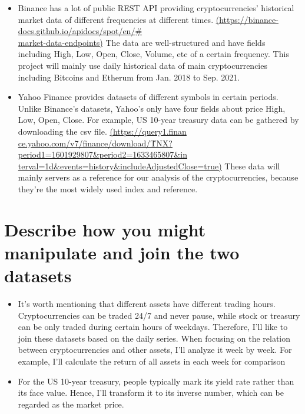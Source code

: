 \documentclass[a4paper]{article}
\begin{document}
\begin{itemize}
    \item Binance has a lot of public REST API providing cryptocurrencies' historical market data of different frequencies at different times. \href{https://binance-docs.github.io/apidocs/spot/en/#market-d\\ata-endpoints}{(https://binance-docs.github.io/apidocs/spot/en/\#\\market-data-endpoints)} The data are well-structured and have fields including High, Low, Open, Close, Volume, etc of a certain frequency. This project will mainly use daily historical data of main cryptocurrencies including Bitcoins and Etherum from Jan. 2018 to Sep. 2021. 
    \item Yahoo Finance provides datasets of different symbols in certain periods. Unlike Binance's datasets, Yahoo's only have four fields about price High, Low, Open, Close. For example, US 10-year treasury data can be gathered by downloading the csv file. \href{https://query1.finance.yahoo.com/v7/finance/download/^TNX?period1=1601929807&period2=1633465807&interval=1d&events=hi\\story&includeAdjustedClose=true}{(https://query1.finan\\ce.yahoo.com/v7/finance/download/\^TNX?period1=1601929807\&period2=1633465807\&in\\terval=1d\&events=history\&includeAdjustedClose=true)} These data will mainly servers as a reference for our analysis of the cryptocurrencies, because they're the most widely used index and reference.
\end{itemize}
\section{Describe how you might manipulate and join the two datasets}
\begin{itemize}
    \item It's worth mentioning that different assets have different trading hours. Cryptocurrencies can be traded 24/7 and never pause, while stock or treasury can be only traded during certain hours of weekdays. Therefore, I'll like to join these datasets based on the daily series. When focusing on the relation between cryptocurrencies and other assets, I'll analyze it week by week. For example, I'll calculate the return of all assets in each week for comparison
    \item For the US 10-year treasury, people typically mark its yield rate rather than its face value. Hence, I'll transform it to its inverse number, which can be regarded as the market price.
\end{itemize}
\end{document}
